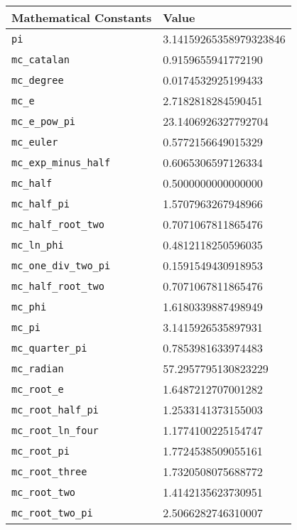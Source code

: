 \begin{tabular}{ll} \hline
Mathematical Constants & Value  \\ \hline
{\tt pi} \index{pi}      & 3.14159265358979323846  \\
{\tt mc\_catalan} \index{mc\_catalan}  & 0.9159655941772190 \\
{\tt mc\_degree} \index{mc\_degree}  & 0.0174532925199433 \\
{\tt mc\_e} \index{mc\_e}  & 2.7182818284590451 \\
{\tt mc\_e\_pow\_pi} \index{mc\_e\_pow\_pi}  & 23.1406926327792704 \\
{\tt mc\_euler} \index{mc\_euler}  & 0.5772156649015329 \\
{\tt mc\_exp\_minus\_half} \index{mc\_exp\_minus\_half}  & 0.6065306597126334 \\
{\tt mc\_half} \index{mc\_half}  & 0.5000000000000000 \\
{\tt mc\_half\_pi} \index{mc\_half\_pi}  & 1.5707963267948966 \\
{\tt mc\_half\_root\_two} \index{mc\_half\_root\_two}  & 0.7071067811865476 \\
{\tt mc\_ln\_phi} \index{mc\_ln\_phi}  & 0.4812118250596035 \\
{\tt mc\_one\_div\_two\_pi} \index{mc\_one\_div\_two\_pi}  & 0.1591549430918953 \\
{\tt mc\_half\_root\_two} \index{mc\_half\_root\_two}  & 0.7071067811865476 \\
{\tt mc\_phi} \index{mc\_phi}  & 1.6180339887498949 \\
{\tt mc\_pi} \index{mc\_pi}  & 3.1415926535897931 \\
{\tt mc\_quarter\_pi} \index{mc\_quarter\_pi}  & 0.7853981633974483 \\
{\tt mc\_radian} \index{mc\_radian}  & 57.2957795130823229 \\
{\tt mc\_root\_e} \index{mc\_root\_e}  & 1.6487212707001282 \\
{\tt mc\_root\_half\_pi} \index{mc\_root\_half\_pi}  & 1.2533141373155003 \\
{\tt mc\_root\_ln\_four} \index{mc\_root\_ln\_four}  & 1.1774100225154747 \\
{\tt mc\_root\_pi} \index{mc\_root\_pi}  & 1.7724538509055161 \\
{\tt mc\_root\_three} \index{mc\_root\_three}  & 1.7320508075688772 \\
{\tt mc\_root\_two} \index{mc\_root\_two}  & 1.4142135623730951 \\
{\tt mc\_root\_two\_pi} \index{mc\_root\_two\_pi}  & 2.5066282746310007 \\

\end{tabular}
